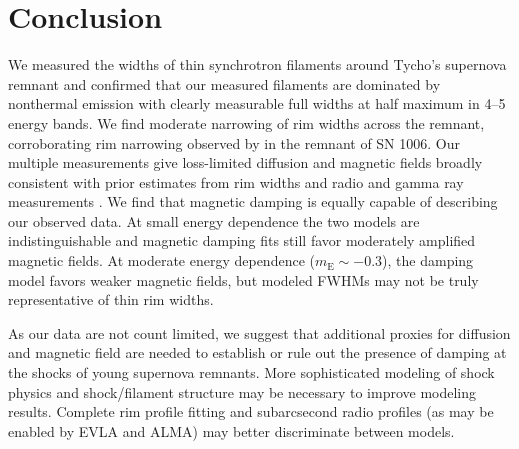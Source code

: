 \documentclass[iop, apj, numberedappendix]{emulateapj}
\newcommand*{\mt}{\mathrm}
\newcommand*{\Chandra}{\textit{Chandra}\ }
\newcommand*{\mE}{m_\mt{E}}
\begin{document}

\section{Conclusion}

We measured the widths of thin synchrotron filaments around Tycho's supernova
remnant and confirmed that our measured filaments are dominated by nonthermal
emission with clearly measurable full widths at half maximum in 4--5 energy
bands.  We find moderate narrowing of rim widths across the remnant,
corroborating rim narrowing observed by \citet{ressler2014} in the remnant of
SN 1006.  Our multiple measurements give loss-limited diffusion and magnetic fields
broadly consistent with prior estimates from rim widths
\citep[e.g.,][]{parizot2006, rettig2012} and radio and gamma ray measurements
\citep{acciari2011, morlino2012}.  We find that magnetic damping is equally
capable of describing our observed data.  At small energy dependence the two
models are indistinguishable and magnetic damping fits still favor moderately
amplified magnetic fields.  At moderate energy dependence ($\mE \sim -0.3$),
the damping model favors weaker magnetic fields, but modeled FWHMs may not
be truly representative of thin rim widths.

As our data are not count limited, we suggest that additional proxies for
diffusion and magnetic field are needed to establish or rule out the presence
of damping at the shocks of young supernova remnants.  More sophisticated
modeling of shock physics \citep[e.g.,][]{zirakashvili2014} and shock/filament
structure \citep[cf.][]{caprioli2013} may be necessary to improve modeling
results.  Complete rim profile fitting and subarcsecond radio profiles (as may
be enabled by EVLA and ALMA) may better discriminate between models.

\end{document}
